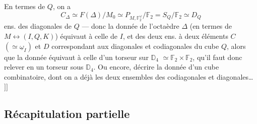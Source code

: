 \documentclass[11pt,a4paper]{article}
\begin{document}
En termes de $Q$, on a
\[
  C_\Delta \simeq F(\Delta)/M_0 \simeq P_{M, \mathbb{F}_2^{\underline{\omega}}}/\mathbb{F}_2 = S_Q/\mathbb{F}_2 \simeq D_Q
\]
ens. des diagonales de $Q$ --- donc la donnée de l'octaèdre $\Delta$ (en termes de $M \leftrightarrow (I, Q, K)$) équivaut à celle de $I$, et des deux ens. à deux éléments $C$ $(\simeq \underline{\omega}_I)$ et $D$ correspondant aux diagonales et codiagonales du cube $Q$, alors que la donnée équivaut à celle d'un torseur sur $\mathbb{D}_4$  $\simeq \mathbb{F}_2 \times \mathbb{F}_2$, qu'il faut donc relever en un torseur sous $\mathbb{D}_4$. Ou encore, décrire la donnée d'un cube combinatoire, dont on a déjà les deux ensembles  des codiagonales et diagonales\ldots\ $]\!]$
\subsection{Récapitulation partielle}
\end{document}
